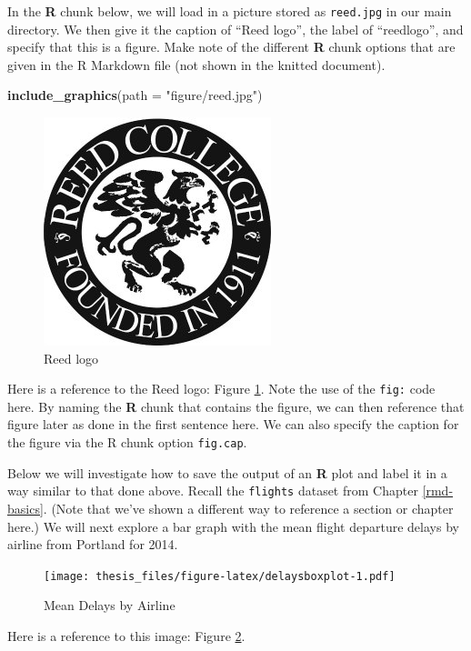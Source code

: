 \documentclass[12pt,twoside]{reedthesis}
\newenvironment{Shaded}{\begin{snugshade}}{\end{snugshade}}
\newcommand{\DataTypeTok}[1]{\textcolor[rgb]{0.13,0.29,0.53}{#1}}
\newcommand{\KeywordTok}[1]{\textcolor[rgb]{0.13,0.29,0.53}{\textbf{#1}}}
\newcommand{\NormalTok}[1]{#1}
\newcommand{\OperatorTok}[1]{\textcolor[rgb]{0.81,0.36,0.00}{\textbf{#1}}}
\newcommand{\StringTok}[1]{\textcolor[rgb]{0.31,0.60,0.02}{#1}}
\begin{document}
In the \textbf{R} chunk below, we will load in a picture stored as \texttt{reed.jpg} in our main directory. We then give it the caption of ``Reed logo'', the label of ``reedlogo'', and specify that this is a figure. Make note of the different \textbf{R} chunk options that are given in the R Markdown file (not shown in the knitted document).
\begin{Shaded}
\begin{Highlighting}[]
\KeywordTok{include_graphics}\NormalTok{(}\DataTypeTok{path =} \StringTok{"figure/reed.jpg"}\NormalTok{)}
\end{Highlighting}
\end{Shaded}
\begin{figure}

{\centering \includegraphics[width=0.2\linewidth]{figure/reed} 

}

\caption{Reed logo}\label{fig:reedlogo}
\end{figure}
Here is a reference to the Reed logo: Figure \ref{fig:reedlogo}. Note the use of the \texttt{fig:} code here. By naming the \textbf{R} chunk that contains the figure, we can then reference that figure later as done in the first sentence here. We can also specify the caption for the figure via the R chunk option \texttt{fig.cap}.

\clearpage

Below we will investigate how to save the output of an \textbf{R} plot and label it in a way similar to that done above. Recall the \texttt{flights} dataset from Chapter \ref{rmd-basics}. (Note that we've shown a different way to reference a section or chapter here.) We will next explore a bar graph with the mean flight departure delays by airline from Portland for 2014.
\begin{Shaded}
\end{Shaded}
\begin{figure}
\centering
\texttt{[image: thesis\_files/figure-latex/delaysboxplot-1.pdf]}
\caption{\label{fig:delaysboxplot}Mean Delays by Airline}
\end{figure}
Here is a reference to this image: Figure \ref{fig:delaysboxplot}.
\end{document}
